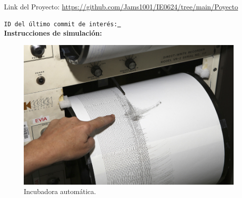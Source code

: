 \begin{abstract}


\end{abstract}

Link del Proyecto: \faGithub   \hspace{0.5mm}\url{https://github.com/Jams1001/IE0624/tree/main/Poyecto} 

\texttt{ID del último commit de interés:\href{https://github.com/Jams1001/IE0624/commit/e96a6fcf3fcca333e339f4346ee823d04a5a9c9e}{
}}\\

\textbf{Instrucciones de simulación:}\\ 
\begin{figure}[H]
\centering
\includegraphics[scale=0.4]{./images/sis.png} 
\caption{Incubadora automática.}
\label{f1}
\end{figure}
